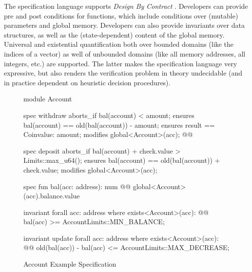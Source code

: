 
The specification language supports {\em Design By Contract}
\cite{DESIGN_BY_CONTRACT}. Developers can provide pre and post conditions for
functions, which include conditions over (mutable) parameters and global
memory. Developers can also provide invariants over data structures, as well as
the (state-dependent) content of the global memory. Universal and
existential quantification both over bounded domains (like the indices of a
vector) as well of unbounded domains (like all memory addresses, all integers,
etc.)  are supported. The latter makes the specification language very
expressive, but also renders the verification problem in theory undecidable (and
in practice dependent on heuristic decision procedures).

\begin{figure}[t!]
\caption{\label{fig:AccountSpec} Account Example Specification}
\begin{MoveBox}
module Account {
  spec withdraw {
    aborts_if bal(account) < amount;
    ensures bal(account) == old(bal(account)) - amount;
    ensures result == Coin{value: amount};
    modifies global<Account>(acc); @\label{line:AccountModifies}@
  }

  spec deposit {
    aborts_if bal(account) + check.value > Limits::max_u64();
    ensures bal(account) == old(bal(account)) + check.value;
    modifies global<Account>(acc);
  }

  spec fun bal(acc: address): num { @\label{line:BalDef}@
    global<Account>(acc).balance.value
  }

  invariant forall acc: address where exists<Account>(acc): @\label{line:BalanceInvariant}@
    bal(acc) >= AccountLimits::MIN_BALANCE;

  invariant update forall acc: address where exists<Account>(acc): @\label{line:DecreaseInvariant}@
    old(bal(acc)) - bal(acc) <= AccountLimits::MAX_DECREASE;
}
\end{MoveBox}
\end{figure}

